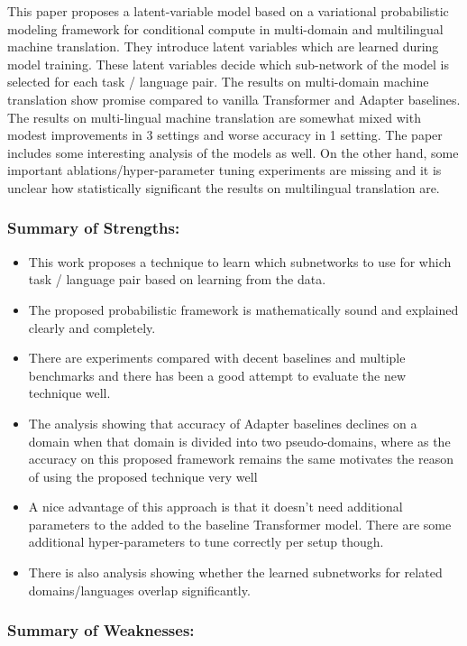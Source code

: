 \documentclass[12pt,times,a4paper,twoside]{article}
\theoremstyle{definition}
\begin{document}
This paper proposes a latent-variable model based on a variational probabilistic modeling framework for conditional compute in multi-domain and multilingual machine translation. They introduce latent variables which are learned during model training. These latent variables decide which sub-network of the model is selected for each task / language pair. The results on multi-domain machine translation show promise compared to vanilla Transformer and Adapter baselines. The results on multi-lingual machine translation are somewhat mixed with modest improvements in 3 settings and worse accuracy in 1 setting. The paper includes some interesting analysis of the models as well. On the other hand, some important ablations/hyper-parameter tuning experiments are missing and it is unclear how statistically significant the results on multilingual translation are.

\subsubsection*{Summary of Strengths:}

\begin{itemize}
\item This work proposes a technique to learn which subnetworks to use for which task / language pair based on learning from the data.
\item The proposed probabilistic framework is mathematically sound and explained clearly and completely.
\item There are experiments compared with decent baselines and multiple benchmarks and there has been a good attempt to evaluate the new technique well.
\item The analysis showing that accuracy of Adapter baselines declines on a domain when that domain is divided into two pseudo-domains, where as the accuracy on this proposed framework remains the same motivates the reason of using the proposed technique very well
\item A nice advantage of this approach is that it doesn’t need additional parameters to the added to the baseline Transformer model. There are some additional hyper-parameters to tune correctly per setup though.
\item There is also analysis showing whether the learned subnetworks for related domains/languages overlap significantly.

\end{itemize}

\subsubsection*{Summary of Weaknesses:}
\end{document}
